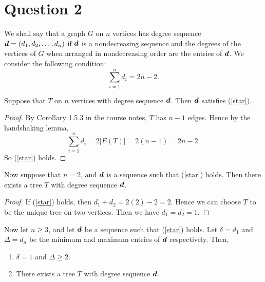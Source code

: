 \documentclass{unswmaths}
\begin{document}
\section*{Question 2}
We shall say that a graph $G$ on $n$ vertices has degree sequence $\boldsymbol{d} = (d_1,d_2,\ldots,d_n)$
if $\boldsymbol{d}$ is a nondecreasing sequence and the degrees
of the vertices of $G$ when arranged in nondecreasing order are the entries of $\boldsymbol{d}$.
We consider the following condition:
\begin{equation}\tag{*}
\label{star}
\sum_{i=1}^n d_i = 2n-2.
\end{equation}

\begin{proposition}[Part (a)]
\label{2a}
    Suppose that $T$ on $n$ vertices with degree sequence $\boldsymbol{d}$.
    Then $\boldsymbol{d}$ satisfies (\ref{star}).
\end{proposition}
\begin{proof}
    By Corollary 1.5.3 in the course notes, $T$ has $n-1$ edges.
    Hence by the handshaking lemma,
    \begin{equation}
        \sum_{i=1}^n d_i = 2|E(T)| = 2(n-1) = 2n-2.
    \end{equation}
    So (\ref{star}) holds.
\end{proof} 
\begin{proposition}[Part (b)]
\label{2b}
    Now suppose that $n = 2$, and $\boldsymbol{d}$ is a sequence such that
    (\ref{star}) holds. Then there exists a tree $T$ with degree
    sequence $\boldsymbol{d}$.
\end{proposition}
\begin{proof}
    If (\ref{star}) holds, then $d_1+d_2 = 2(2)-2 = 2$. Hence
    we can choose $T$ to be the unique tree on two vertices. Then
    we have $d_1 = d_2 = 1$.
\end{proof}
\begin{proposition}[Part (c)]
\label{2c}
    Now let $n \geq 3$, and let $\boldsymbol{d}$ be a sequence such that (\ref{star}) holds.
    Let $\delta = d_1$ and $\Delta = d_n$ be the minimum and maximum entries of $\boldsymbol{d}$
    respectively. Then,
    \begin{enumerate}
        \item{} $\delta = 1$ and $\Delta \geq 2$.
        \item{} There exists a tree $T$ with degree sequence $\boldsymbol{d}$.
    \end{enumerate}
\end{proposition}
\end{document}
